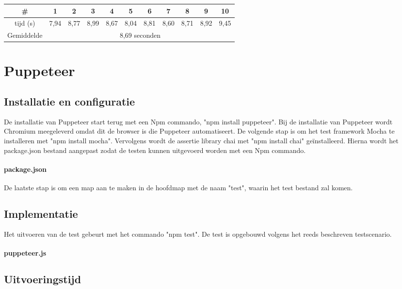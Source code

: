 \begin{tabular}{ |c| |c |c |c |c |c |c |c |c |c |c| }
\hline
	\# & 1 & 2 & 3 & 4 & 5 & 6 & 7 & 8 & 9 & 10\\
\hline
	tijd (s) & 7,94 & 8,77 & 8,99 & 8,67 & 8,04 & 8,81 & 8,60 & 8,71 & 8,92 & 9,45\\
\hline
 Gemiddelde & \multicolumn{10}{c|}{8,69 seconden}\\
\hline
\end{tabular}

\clearpage
\section{Puppeteer}
\subsection{Installatie en configuratie}
De installatie van Puppeteer start terug met een Npm commando, "npm install puppeteer". Bij de installatie van Puppeteer wordt Chromium meegeleverd omdat dit de browser is die Puppeteer automatiseert. De volgende stap is om het test \gls{framework} Mocha te installeren met "npm install mocha". Vervolgens wordt de \gls{assertie} \gls{library} chai met "npm install chai" geïnstalleerd. Hierna wordt het package.json bestand aangepast zodat de testen kunnen uitgevoerd worden met een Npm commando.

\paragraph{package.json}


De laatste stap is om een map aan te maken in de hoofdmap met de naam "test", waarin het test bestand zal komen.

\subsection{Implementatie}
Het uitvoeren van de test gebeurt met het commando "npm test". De test is opgebouwd volgens het reeds beschreven testscenario.

\paragraph{puppeteer.js}

\subsection{Uitvoeringstijd}


